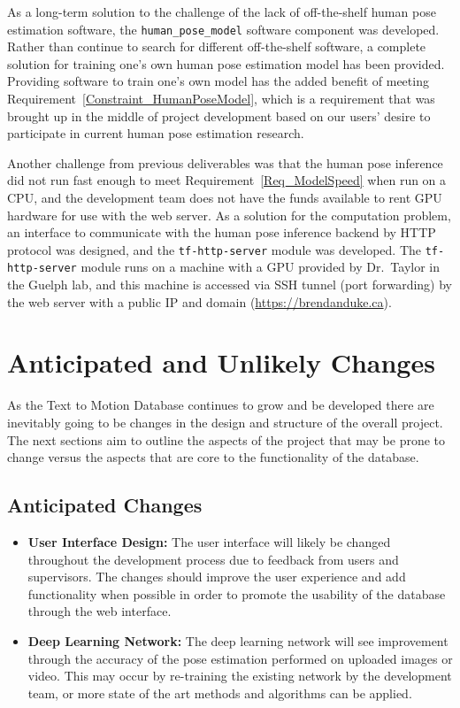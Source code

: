 \documentclass{scrreprt}
\begin{document}
As a long-term solution to the challenge of the lack of off-the-shelf human
pose estimation software, the \verb|human_pose_model| software component was
developed. Rather than continue to search for different off-the-shelf software,
a complete solution for training one's own human pose estimation model has been
provided. Providing software to train one's own model has the added benefit of
meeting Requirement~\ref{Constraint_HumanPoseModel}, which is a requirement
that was brought up in the middle of project development based on our users'
desire to participate in current human pose estimation research.

Another challenge from previous deliverables was that the human pose inference
did not run fast enough to meet Requirement~\ref{Req_ModelSpeed} when run on a
CPU, and the development team does not have the funds available to rent GPU
hardware for use with the web server. As a solution for the computation
problem, an interface to communicate with the human pose inference backend by
HTTP protocol was designed, and the \verb|tf-http-server| module was developed.
The \verb|tf-http-server| module runs on a machine with a GPU provided by Dr.\
Taylor in the Guelph lab, and this machine is accessed via SSH tunnel (port
forwarding) by the web server with a public IP and domain
(\url{https://brendanduke.ca}).

\chapter{Anticipated and Unlikely Changes}

As the Text to Motion Database continues to grow and be developed there are
inevitably going to be changes in the design and structure of the overall
project. The next sections aim to outline the aspects of the project that may
be prone to change versus the aspects that are core to the functionality of the
database.

\section{Anticipated Changes}

\begin{itemize}
    \item \textbf {User Interface Design:} The user interface will likely be
            changed throughout the development process due to feedback from
                  users and supervisors. The changes should improve the user
                  experience and add functionality when possible in order to
                  promote the usability of the database through the web
                  interface.

    \item \textbf{Deep Learning Network:} The deep learning network will see
            improvement through the accuracy of the pose estimation performed
                  on uploaded images or video. This may occur by re-training
                  the existing network by the development team, or more state
                  of the art methods and algorithms can be applied.
\end{itemize}
\end{document}
